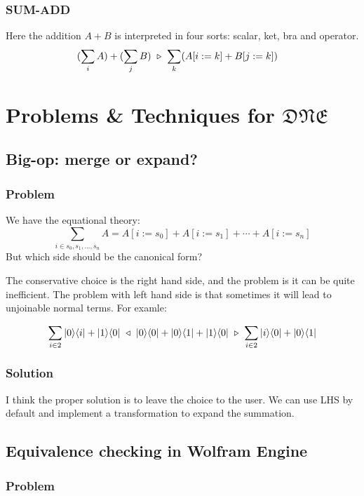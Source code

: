 \subsubsection*{\textsf{SUM-ADD}}
Here the addition $A + B$ is interpreted in four sorts: scalar, ket, bra and operator.
\begin{align*}
  & (\sum_i A) + (\sum_j B) \ \triangleright\  \sum_k (A[i:=k] + B[j:=k])
\end{align*}


\section{Problems \& Techniques for $\mathfrak{DNE}$}

\subsection{Big-op: merge or expand?}

\subsubsection*{Problem}
We have the equational theory:
$$
\sum_{i\in{s_0, s_1, ..., s_n}} A = A[i:=s_0] + A[i:=s_1] + \cdots + A[i:=s_n]
$$
But which side should be the canonical form?

The conservative choice is the right hand side, and the problem is it can be quite inefficient. The problem with left hand side is that sometimes it will lead to unjoinable normal terms. For examle:

$$
\sum_{i \in 2} |0\rangle\langle i| + |1\rangle\langle 0| \ \triangleleft\  |0\rangle\langle 0| + |0\rangle\langle 1| + |1\rangle\langle 0| \ \triangleright\  \sum_{i \in 2} |i\rangle\langle 0| + |0\rangle\langle 1|
$$

\subsubsection*{Solution}
I think the proper solution is to leave the choice to the user. We can use LHS by default and implement a transformation to expand the summation.

\subsection{Equivalence checking in Wolfram Engine}

\subsubsection*{Problem}

